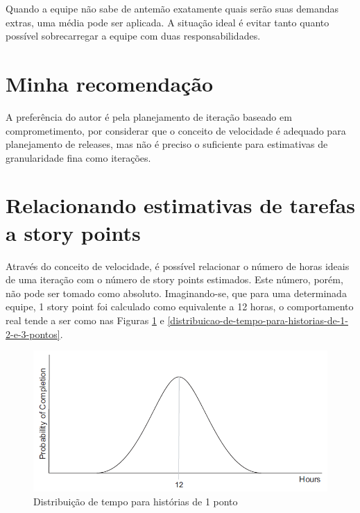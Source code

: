 \documentclass[a4paper,abntfigtabnum,noindentfirst]{abnt}
\begin{document}
Quando a equipe não sabe de antemão exatamente quais serão suas demandas extras, uma média pode ser aplicada. A situação ideal é evitar tanto quanto possível sobrecarregar a equipe com duas responsabilidades.


\section{Minha recomendação}

A preferência do autor é pela planejamento de iteração baseado em comprometimento, por considerar que o conceito de velocidade é adequado para planejamento de releases, mas não é preciso o suficiente para estimativas de granularidade fina como iterações.


\section{Relacionando estimativas de tarefas a story points}

Através do conceito de velocidade, é possível relacionar o número de horas ideais de uma iteração com o número de story points estimados. Este número, porém, não pode ser tomado como absoluto. Imaginando-se, que para uma determinada equipe, 1 story point foi calculado como equivalente a 12 horas, o comportamento real tende a ser como nas Figuras \ref{distribuicao-de-tempo-para-historia-de-1-ponto} e \ref{distribuicao-de-tempo-para-historias-de-1-2-e-3-pontos}.

\begin{figure}
  \caption{Distribuição de tempo para histórias de 1 ponto}
  \label{distribuicao-de-tempo-para-historia-de-1-ponto}
  \begin{center}
  \includegraphics[scale=0.6]{distribuicao-de-tempo-para-historia-de-1-ponto}
  \end{center}
\end{figure}
\end{document}
